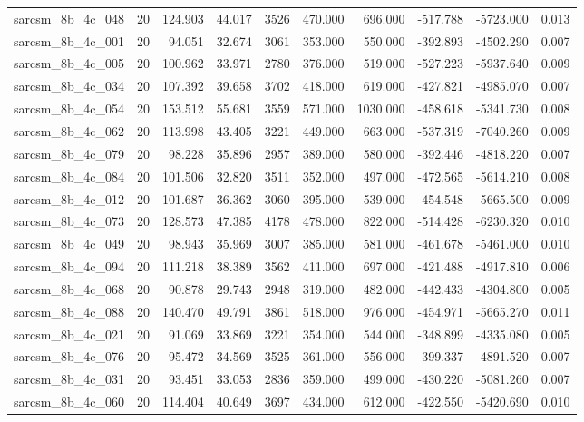 \begin{tabular}{lrrrrrrrrr}
sarcsm\_8b\_4c\_048 & 20 & 124.903 & 44.017 & 3526 & 470.000 & 696.000 & -517.788 & -5723.000 & 0.013 \\
sarcsm\_8b\_4c\_001 & 20 & 94.051 & 32.674 & 3061 & 353.000 & 550.000 & -392.893 & -4502.290 & 0.007 \\
sarcsm\_8b\_4c\_005 & 20 & 100.962 & 33.971 & 2780 & 376.000 & 519.000 & -527.223 & -5937.640 & 0.009 \\
sarcsm\_8b\_4c\_034 & 20 & 107.392 & 39.658 & 3702 & 418.000 & 619.000 & -427.821 & -4985.070 & 0.007 \\
sarcsm\_8b\_4c\_054 & 20 & 153.512 & 55.681 & 3559 & 571.000 & 1030.000 & -458.618 & -5341.730 & 0.008 \\
sarcsm\_8b\_4c\_062 & 20 & 113.998 & 43.405 & 3221 & 449.000 & 663.000 & -537.319 & -7040.260 & 0.009 \\
sarcsm\_8b\_4c\_079 & 20 & 98.228 & 35.896 & 2957 & 389.000 & 580.000 & -392.446 & -4818.220 & 0.007 \\
sarcsm\_8b\_4c\_084 & 20 & 101.506 & 32.820 & 3511 & 352.000 & 497.000 & -472.565 & -5614.210 & 0.008 \\
sarcsm\_8b\_4c\_012 & 20 & 101.687 & 36.362 & 3060 & 395.000 & 539.000 & -454.548 & -5665.500 & 0.009 \\
sarcsm\_8b\_4c\_073 & 20 & 128.573 & 47.385 & 4178 & 478.000 & 822.000 & -514.428 & -6230.320 & 0.010 \\
sarcsm\_8b\_4c\_049 & 20 & 98.943 & 35.969 & 3007 & 385.000 & 581.000 & -461.678 & -5461.000 & 0.010 \\
sarcsm\_8b\_4c\_094 & 20 & 111.218 & 38.389 & 3562 & 411.000 & 697.000 & -421.488 & -4917.810 & 0.006 \\
sarcsm\_8b\_4c\_068 & 20 & 90.878 & 29.743 & 2948 & 319.000 & 482.000 & -442.433 & -4304.800 & 0.005 \\
sarcsm\_8b\_4c\_088 & 20 & 140.470 & 49.791 & 3861 & 518.000 & 976.000 & -454.971 & -5665.270 & 0.011 \\
sarcsm\_8b\_4c\_021 & 20 & 91.069 & 33.869 & 3221 & 354.000 & 544.000 & -348.899 & -4335.080 & 0.005 \\
sarcsm\_8b\_4c\_076 & 20 & 95.472 & 34.569 & 3525 & 361.000 & 556.000 & -399.337 & -4891.520 & 0.007 \\
sarcsm\_8b\_4c\_031 & 20 & 93.451 & 33.053 & 2836 & 359.000 & 499.000 & -430.220 & -5081.260 & 0.007 \\
sarcsm\_8b\_4c\_060 & 20 & 114.404 & 40.649 & 3697 & 434.000 & 612.000 & -422.550 & -5420.690 & 0.010 \\

\end{tabular}
